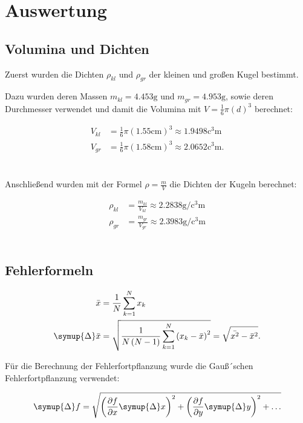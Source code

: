 \section{Auswertung}
\label{sec:Auswertung}
\subsection{Volumina und Dichten}
Zuerst wurden die Dichten $\rho_{kl}$ und $\rho_{gr}$ der kleinen und großen Kugel bestimmt. 

Dazu wurden deren Massen
$m_{kl} = 4.453\unit{\gram}$ und $m_{gr} = 4.953 \unit{\gram}$, sowie deren Durchmesser verwendet und
damit die Volumina mit $V = \frac{1}{6}\pi\left(d\right)^3$ berechnet:

\begin{align*}
  V_{kl} &= \frac{1}{6}\pi\left(1.55\unit{\centi\meter}\right)^3 \approx 1.9498\unit{\cubic\centi\meter}\\
  V_{gr} &= \frac{1}{6}\pi\left(1.58\unit{\centi\meter}\right)^3 \approx 2.0652\unit{\cubic\centi\meter}.
\end{align*} \\
\\

Anschließend wurden mit der Formel $\rho = \frac{m}{V}$ die Dichten der Kugeln berechnet:

\begin{align*}
  \rho_{kl} &= \frac{m_{kl}}{V_{kl}} \approx 2.2838\unit{\gram\per\cubic\centi\meter}\\
  \rho_{gr} &= \frac{m_{gr}}{V_{gr}} \approx 2.3983\unit{\gram\per\cubic\centi\meter}
\end{align*}\\

\subsection{Fehlerformeln}

\begin{align*}
  \bar{x} &= \frac{1}{N}\sum_{k=1}^{N} x_k\\
  \symup{\Delta}\bar{x} &= \sqrt{\frac{1}{N\left(N-1\right)}\sum_{k=1}^{N}\left(x_k-\bar{x}\right)^2} = \sqrt{\bar{x^2}-\bar{x}^2}.
\end{align*}

Für die Berechnung der Fehlerfortpflanzung wurde die Gauß´schen Fehlerfortpflanzung verwendet:

\begin{equation*}
  \symup{\Delta}f = \sqrt{\left(\frac{\partial f}{\partial x}\symup{\Delta}x\right)^2 + \left(\frac{\partial f}{\partial y}\symup{\Delta}y\right)^2 +\ldots}
\end{equation*} \\

